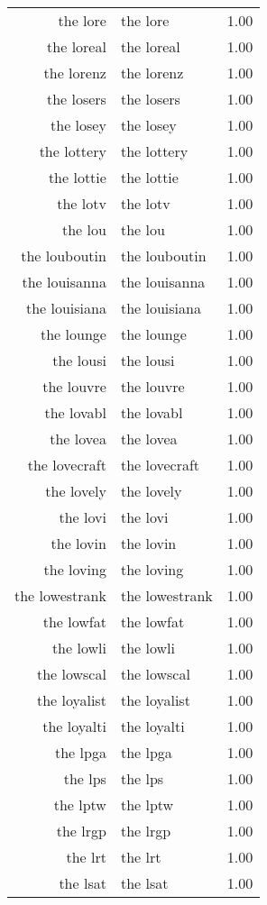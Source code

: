 \begin{table}[ht]
\begin{tabular}{rlr}
  the lore & the lore & 1.00 \\ 
  the loreal & the loreal & 1.00 \\ 
  the lorenz & the lorenz & 1.00 \\ 
  the losers & the losers & 1.00 \\ 
  the losey & the losey & 1.00 \\ 
  the lottery & the lottery & 1.00 \\ 
  the lottie & the lottie & 1.00 \\ 
  the lotv & the lotv & 1.00 \\ 
  the lou & the lou & 1.00 \\ 
  the louboutin & the louboutin & 1.00 \\ 
  the louisanna & the louisanna & 1.00 \\ 
  the louisiana & the louisiana & 1.00 \\ 
  the lounge & the lounge & 1.00 \\ 
  the lousi & the lousi & 1.00 \\ 
  the louvre & the louvre & 1.00 \\ 
  the lovabl & the lovabl & 1.00 \\ 
  the lovea & the lovea & 1.00 \\ 
  the lovecraft & the lovecraft & 1.00 \\ 
  the lovely & the lovely & 1.00 \\ 
  the lovi & the lovi & 1.00 \\ 
  the lovin & the lovin & 1.00 \\ 
  the loving & the loving & 1.00 \\ 
  the lowestrank & the lowestrank & 1.00 \\ 
  the lowfat & the lowfat & 1.00 \\ 
  the lowli & the lowli & 1.00 \\ 
  the lowscal & the lowscal & 1.00 \\ 
  the loyalist & the loyalist & 1.00 \\ 
  the loyalti & the loyalti & 1.00 \\ 
  the lpga & the lpga & 1.00 \\ 
  the lps & the lps & 1.00 \\ 
  the lptw & the lptw & 1.00 \\ 
  the lrgp & the lrgp & 1.00 \\ 
  the lrt & the lrt & 1.00 \\ 
  the lsat & the lsat & 1.00 \\ 

\end{tabular}
\end{table}
